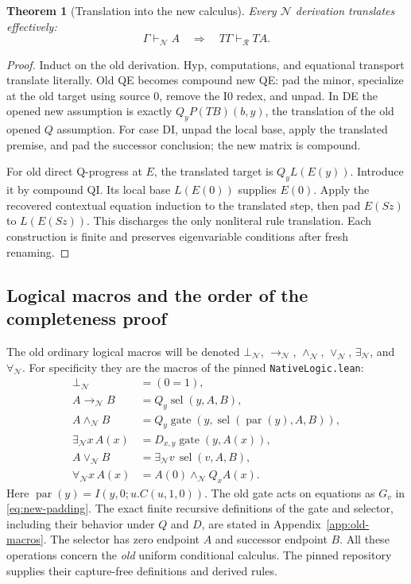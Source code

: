 \documentclass[11pt,a4paper]{article}
\newtheorem{theorem}{Theorem}[section]
\theoremstyle{definition}\newtheorem{definition}[theorem]{Definition}
\begin{document}
\begin{theorem}[Translation into the new calculus]
\label{thm:new-T}
Every $\mathcal N$ derivation translates effectively:
\[
 \Gamma\vdash_{\mathcal N}A
 \quad\Longrightarrow\quad
 T\Gamma\vdash_{\mathcal R}TA.
\]
\end{theorem}
\begin{proof}
Induct on the old derivation.  Hyp, computations, and equational transport
translate literally.  Old QE becomes compound new QE: pad the minor,
specialize at the old target using source $0$, remove the I0 redex, and
unpad.  In DE the opened new assumption is exactly
$Q_yP(TB)(b,y)$, the translation of the old opened $Q$ assumption.
For case DI, unpad the local base, apply the translated premise, and pad
the successor conclusion; the new matrix is compound.

For old direct Q-progress at $E$, the translated target is $Q_yL(E(y))$.
Introduce it by compound QI.  Its local base $L(E(0))$ supplies $E(0)$.
Apply the recovered contextual equation induction to the translated step,
then pad $E(Sz)$ to $L(E(Sz))$.  This discharges the only nonliteral rule
translation.  Each construction is finite and preserves eigenvariable
conditions after fresh renaming.
\end{proof}

\subsection{Logical macros and the order of the completeness proof}
\label{subsec:new-image-logic}

The old ordinary logical macros will be denoted
$\bot_{\mathcal N}$, $\to_{\mathcal N}$, $\wedge_{\mathcal N}$,
$\vee_{\mathcal N}$, $\exists_{\mathcal N}$, and $\forall_{\mathcal N}$.
For specificity they are the macros of the pinned
\texttt{NativeLogic.lean}:\cite{native}
\begin{equation}
 \begin{aligned}
 \bot_{\mathcal N}&=(0=1),\\
 A\to_{\mathcal N}B&=Q_y\operatorname{sel}(y,A,B),\\
 A\wedge_{\mathcal N}B
   &=Q_y\operatorname{gate}
           (y,\operatorname{sel}(\operatorname{par}(y),A,B)),\\
 \exists_{\mathcal N}x\,A(x)&=D_{x,y}\operatorname{gate}(y,A(x)),\\
 A\vee_{\mathcal N}B&=\exists_{\mathcal N}v\,
                                   \operatorname{sel}(v,A,B),\\
 \forall_{\mathcal N}x\,A(x)&=A(0)\wedge_{\mathcal N}Q_xA(x).
 \end{aligned}
 \label{eq:new-old-macros}
\end{equation}
Here $\operatorname{par}(y)=I(y,0;u.C(u,1,0))$.
The old gate acts on equations as $G_v$ in \eqref{eq:new-padding}.
The exact finite recursive definitions of the gate and selector, including
their behavior under $Q$ and $D$, are stated in Appendix~\ref{app:old-macros}.
The selector has zero endpoint $A$ and successor endpoint $B$.
All these operations concern the \emph{old} uniform conditional calculus.
The pinned repository supplies their capture-free definitions and derived
rules.
\end{document}
